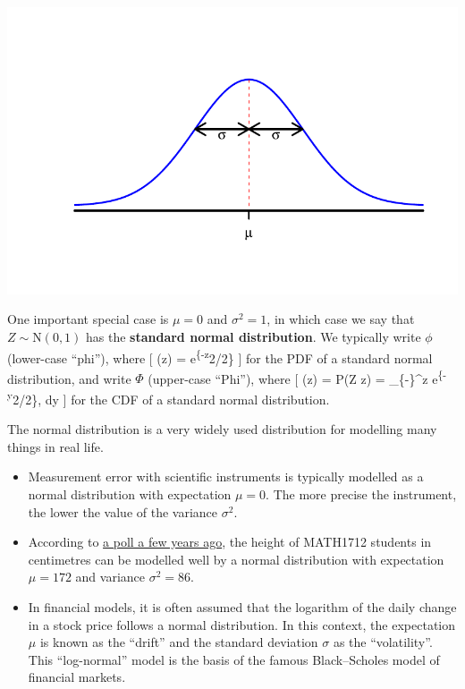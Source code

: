 \documentclass[
  letterpaper,
]{report}
\providecommand{\tightlist}{%
  \setlength{\itemsep}{0pt}\setlength{\parskip}{0pt}}\usepackage{longtable,booktabs,array}
\theoremstyle{definition}
\theoremstyle{definition}
\theoremstyle{remark}
\begin{document}
\includegraphics{sections/L17-normal_files/figure-pdf/norm-pic-2-1.pdf}

One important special case is \(\mu = 0\) and \(\sigma^2 = 1\), in which
case we say that \(Z \sim \mathrm N(0,1)\) has the \textbf{standard
normal distribution}. We typically write \(\phi\) (lower-case ``phi''),
where {[} \phi(z) = 
\mathrm e\textsuperscript{\{-z}2/2\} {]} for the PDF of a standard
normal distribution, and write \(\Phi\) (upper-case ``Phi''), where {[}
\Phi(z) = \mathbb P(Z \leq z) = 
\int\_\{-\infty\}\^{}z \mathrm e\textsuperscript{\{-y}2/2\}, \mathrm dy
{]} for the CDF of a standard normal distribution.

The normal distribution is a very widely used distribution for modelling
many things in real life.

\begin{itemize}
\tightlist
\item
  Measurement error with scientific instruments is typically modelled as
  a normal distribution with expectation \(\mu = 0\). The more precise
  the instrument, the lower the value of the variance \(\sigma^2\).
\item
  According to
  \href{http://www1.maths.leeds.ac.uk/~voss/2019/MATH1712/index.html}{a
  poll a few years ago}, the height of MATH1712 students in centimetres
  can be modelled well by a normal distribution with expectation
  \(\mu = 172\) and variance \(\sigma^2 = 86\).
\item
  In financial models, it is often assumed that the logarithm of the
  daily change in a stock price follows a normal distribution. In this
  context, the expectation \(\mu\) is known as the ``drift'' and the
  standard deviation \(\sigma\) as the ``volatility''. This
  ``log-normal'' model is the basis of the famous Black--Scholes model
  of financial markets.
\end{itemize}
\end{document}
